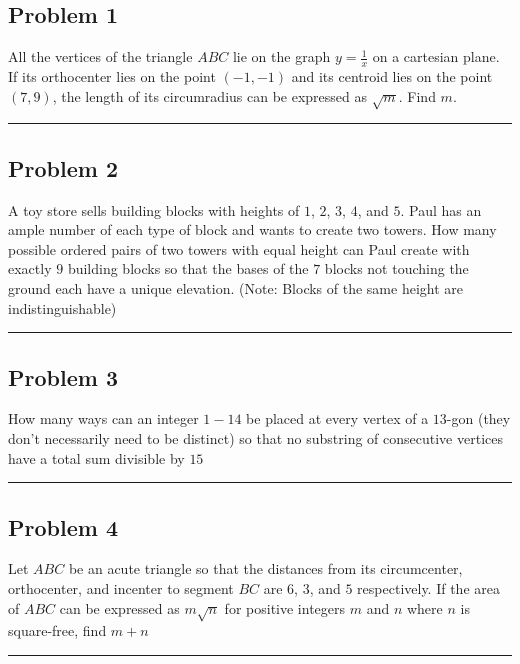 \documentclass[10pt]{scrartcl}\usepackage[utf8]{inputenc}\usepackage{amsmath}\usepackage{amsfonts} \usepackage{tikz}\usepackage{asymptote}\usepackage[most]{tcolorbox}\usepackage{fancyhdr}\usepackage{geometry}\usepackage{color}\usepackage{lewis}\usepackage[T1]{fontenc}\usepackage[explicit]{titlesec}\usepackage{fontawesome}\usepackage{sansmathfonts}\pagestyle{fancy}
\begin{document}
\newpage\restoregeometry{}\setlength{\parindent}{0pt}
\subsection*{Problem 1}
All the vertices of the triangle \(ABC\) lie on the graph \(y=\frac{1}{x}\) on a cartesian plane. If its orthocenter lies on the point \((-1, -1)\) and its centroid lies on the point \((7, 9)\), the length of its circumradius can be expressed as \(\sqrt{m}\). Find \(m\).
\\
\noindent\rule{14.5cm}{0.8pt}
\subsection*{Problem 2}
A toy store sells building blocks with heights of $1$, $2$, $3$, $4$, and $5$. Paul has an ample number of each type of block and wants to create two towers. How many possible ordered pairs of two towers with equal height can Paul create with exactly $9$ building blocks so that the bases of the $7$ blocks not touching the ground each have a unique elevation. (Note: Blocks of the same height are indistinguishable)
\\
\noindent\rule{14.5cm}{0.8pt}
\subsection*{Problem 3}
How many ways can an integer $1-14$ be placed at every vertex of a $13$-gon (they don't necessarily need to be distinct) so that no substring of consecutive vertices have a total sum divisible by $15$
\\
\noindent\rule{14.5cm}{0.8pt}
\subsection*{Problem 4}
Let $ABC$ be an acute triangle so that the distances from its circumcenter, orthocenter, and incenter to segment $BC$ are $6$, $3$, and $5$ respectively. If the area of $ABC$ can be expressed as $m\sqrt{n}$ for positive integers $m$ and $n$ where $n$ is square-free, find $m+n$
\\
\noindent\rule{14.5cm}{0.8pt}
\end{document}
